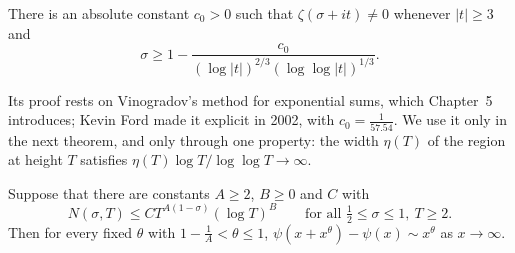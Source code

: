 \begin{theorem}\label{thm:vk}
There is an absolute constant $c_0>0$ such that $\zeta(\sigma+it)\ne0$ whenever $|t|\ge3$ and
\[
\sigma\ge1-\frac{c_0}{(\log|t|)^{2/3}(\log\log|t|)^{1/3}}.
\]
\end{theorem}

Its proof rests on Vinogradov's method for exponential sums, which Chapter~5 introduces; Kevin Ford made it explicit in 2002, with $c_0=\frac1{57.54}$. We use it only in the next theorem, and only through one property: the width $\eta(T)$ of the region at height $T$ satisfies $\eta(T)\log T/\log\log T\to\infty$.

\begin{theorem}[Ingham, 1937]\label{thm:ingham}
Suppose that there are constants $A\ge2$, $B\ge0$ and $C$ with
\[
N(\sigma,T)\le CT^{A(1-\sigma)}(\log T)^B\qquad\text{for all }\tfrac12\le\sigma\le1,\ T\ge2.
\]
Then for every fixed $\theta$ with $1-\frac1A<\theta\le1$, $\psi(x+x^\theta)-\psi(x)\sim x^\theta$ as $x\to\infty$.
\end{theorem}

